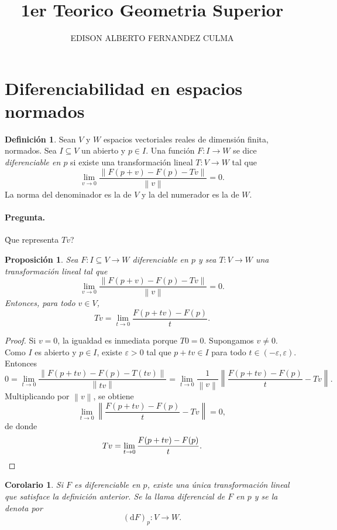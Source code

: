 \documentclass[11pt]{article}
\title{1er Teorico Geometria Superior}
\author{EDISON ALBERTO FERNANDEZ CULMA}
\date{}
\newtheorem{proposition}[theorem]{Proposici\'on}
\newtheorem{corollary}[theorem]{Corolario}
\theoremstyle{definition}
\newtheorem{definition}[theorem]{Definici\'on}
\theoremstyle{remark}
\newcommand{\norm}[1]{\left\lVert #1 \right\rVert}
\newcommand{\dd}{\mathrm{d}}
\begin{document}
\maketitle

\section*{Diferenciabilidad en espacios normados}

\begin{definition}
Sean $V$ y $W$ espacios vectoriales reales de dimensi\'on finita, normados. Sea $I \subseteq V$ un abierto y $p \in I$. Una funci\'on $F \colon I \to W$ se dice \emph{diferenciable en $p$} si existe una transformaci\'on lineal $T \colon V \to W$ tal que
\[
\lim_{v \to 0} \frac{\norm{F(p+v)-F(p)-Tv}}{\norm{v}} = 0.
\]
La norma del denominador es la de $V$ y la del numerador es la de $W$.
\end{definition}

\paragraph{Pregunta.}
\`{Que} representa $Tv$?

\begin{proposition}
Sea $F \colon I \subseteq V \to W$ diferenciable en $p$ y sea $T \colon V \to W$ una transformaci\'on lineal tal que
\[
\lim_{v \to 0} \frac{\norm{F(p+v)-F(p)-Tv}}{\norm{v}} = 0.
\]
Entonces, para todo $v \in V$,
\[
Tv = \lim_{t \to 0} \frac{F(p+tv)-F(p)}{t}.
\]
\end{proposition}

\begin{proof}
Si $v=0$, la igualdad es inmediata porque $T0=0$. Supongamos $v \neq 0$. Como $I$ es abierto y $p \in I$, existe $\varepsilon>0$ tal que $p+tv \in I$ para todo $t \in (-\varepsilon,\varepsilon)$. Entonces
\[
0
= \lim_{t \to 0}
\frac{\norm{F(p+tv)-F(p)-T(tv)}}{\norm{tv}}
= \lim_{t \to 0}
\frac{1}{\norm{v}}
\norm{\frac{F(p+tv)-F(p)}{t}-Tv}.
\]
Multiplicando por $\norm{v}$, se obtiene
\[
\lim_{t \to 0}\norm{\frac{F(p+tv)-F(p)}{t}-Tv}=0,
\]
de donde
\[
Tv = \lim_{t \to 0} \frac{F(p+tv)-F(p)}{t}.
\qedhere
\]
\end{proof}

\begin{corollary}
Si $F$ es diferenciable en $p$, existe una \'unica transformaci\'on lineal que satisface la definici\'on anterior. Se la llama \emph{diferencial de $F$ en $p$} y se la denota por
\[
(\dd F)_p \colon V \to W.
\]
\end{corollary}
\end{document}
